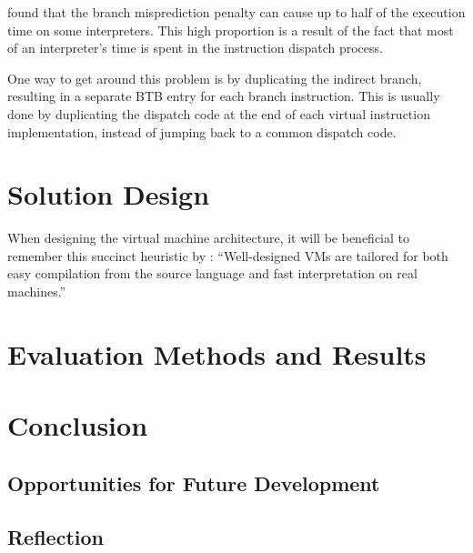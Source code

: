 		\cite{structureinterpreters} found that the branch misprediction penalty can cause up to half of the execution time on some interpreters. This high proportion is a result of the fact that most of an interpreter's time is spent in the instruction dispatch process.
		
		One way to get around this problem is by duplicating the indirect branch, resulting in a separate BTB entry for each branch instruction. This is usually done by duplicating the dispatch code at the end of each virtual instruction implementation, instead of jumping back to a common dispatch code.
		 
		
\chapter{Solution Design}
	When designing the virtual machine architecture, it will be beneficial to remember this succinct heuristic by \cite{structureinterpreters}: ``Well-designed VMs are tailored for both easy compilation from the source language and fast interpretation on real machines.''

\chapter{Evaluation Methods and Results}

\chapter{Conclusion}
	
	\section{Opportunities for Future Development}
	
	\section{Reflection}

\bibliographysection

